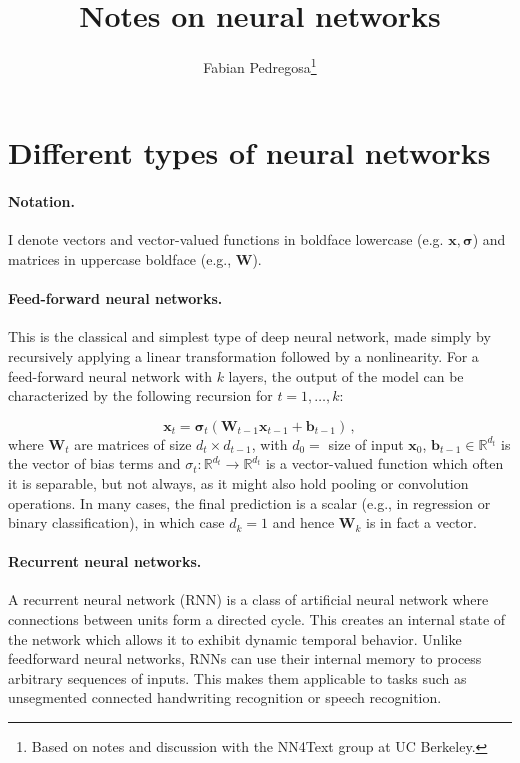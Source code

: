 \documentclass[paper=a4, fontsize=11pt,twoside, abstracton]{scrartcl}
\date{\vspace{-5ex}}
\title{Notes on neural networks}
\author{Fabian Pedregosa\thanks{Based on notes and discussion with the NN4Text group at UC Berkeley.}}
\def\RR{{\mathbb R}}
\def\xx{{\boldsymbol x}}
\def\WW{{\boldsymbol W}}
\def\ssigma{{\boldsymbol \sigma}}
\begin{document}
\maketitle




\section{Different types of neural networks}


\paragraph{Notation.} I denote vectors and vector-valued functions in boldface lowercase (e.g. $\xx, \ssigma$) and matrices in uppercase boldface (e.g., $\WW$).

\paragraph{Feed-forward neural networks.} This is the classical and simplest type of deep neural network, made simply by recursively applying a linear transformation followed by a nonlinearity. For a feed-forward neural network with $k$ layers, the output of the model can be characterized by the following recursion for $t=1, \ldots, k$:

\begin{equation}\label{eq:feed_forward}
  \xx_{t} = \ssigma_t(\boldsymbol{W}_{t-1} \xx_{t-1} + \boldsymbol{b}_{t-1}) \,,
\end{equation}
where $\WW_{t}$ are matrices of size $d_{t} \times d_{t-1}$, with $d_0 = $ size of input $\xx_0$, $\boldsymbol{b}_{t-1} \in \RR^{d_t}$ is the vector of bias terms and $\sigma_t: \RR^{d_t} \to  \RR^{d_t}$ is a vector-valued function which often it is separable, but not always, as it might also hold pooling or convolution operations. In many cases, the final prediction is a scalar (e.g., in regression or binary classification), in which case $d_k = 1$ and hence $\WW_k$
is in fact a vector.

\paragraph{Recurrent neural networks.} A recurrent neural network (RNN) is a class of artificial neural network where connections between units form a directed cycle. This creates an internal state of the network which allows it to exhibit dynamic temporal behavior. Unlike feedforward neural networks, RNNs can use their internal memory to process arbitrary sequences of inputs. This makes them applicable to tasks such as unsegmented connected handwriting recognition or speech recognition.
\end{document}
